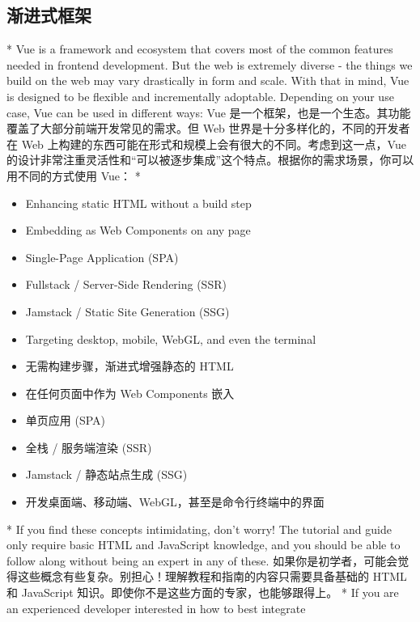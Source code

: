 \begin{paracol}{2}
\subsection{渐进式框架}
\switchcolumn[0]*%
Vue is a framework and ecosystem that covers most of the common features
needed in frontend development. But the web is extremely diverse - the
things we build on the web may vary drastically in form and scale. With
that in mind, Vue is designed to be flexible and incrementally
adoptable. Depending on your use case, Vue can be used in different
ways:
\switchcolumn
Vue 是一个框架，也是一个生态。其功能覆盖了大部分前端开发常见的需求。但
Web 世界是十分多样化的，不同的开发者在 Web
上构建的东西可能在形式和规模上会有很大的不同。考虑到这一点，Vue
的设计非常注重灵活性和``可以被逐步集成''这个特点。根据你的需求场景，你可以用不同的方式使用
Vue：
\switchcolumn[0]*%
\begin{itemize}
\item
    Enhancing static HTML without a build step
\item
    Embedding as Web Components on any page
\item
    Single-Page Application (SPA)
\item
    Fullstack / Server-Side Rendering (SSR)
\item
    Jamstack / Static Site Generation (SSG)
\item
    Targeting desktop, mobile, WebGL, and even the terminal
\end{itemize}
\switchcolumn
\begin{itemize}
\item
    无需构建步骤，渐进式增强静态的 HTML
\item
    在任何页面中作为 Web Components 嵌入
\item
    单页应用 (SPA)
\item
    全栈 / 服务端渲染 (SSR)
\item
    Jamstack / 静态站点生成 (SSG)
\item
    开发桌面端、移动端、WebGL，甚至是命令行终端中的界面
\end{itemize}
\switchcolumn[0]*%
If you find these concepts intimidating, don't worry! The tutorial and
guide only require basic HTML and JavaScript knowledge, and you should
be able to follow along without being an expert in any of these.
\switchcolumn
如果你是初学者，可能会觉得这些概念有些复杂。别担心！理解教程和指南的内容只需要具备基础的
HTML 和 JavaScript 知识。即使你不是这些方面的专家，也能够跟得上。
\switchcolumn[0]*%
If you are an experienced developer interested in how to best integrate

\end{paracol}
